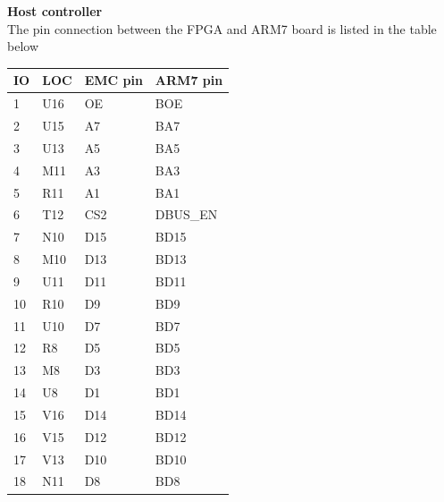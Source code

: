 \textbf{Host controller}\\
The pin connection between the FPGA and ARM7 board is listed in the table below
\begin{table}[H]
    \begin{tabular}{|p{3cm}|p{3cm}|p{3cm}|p{3cm}|}
        \hline
        \textbf{IO} & \textbf{LOC} & \textbf{EMC pin} & \textbf{ARM7 pin} \\ \hline
        1           & U16          & OE               & BOE               \\ \hline
        2           & U15          & A7               & BA7               \\ \hline
        3           & U13          & A5               & BA5               \\ \hline
        4           & M11          & A3               & BA3               \\ \hline
        5           & R11          & A1               & BA1               \\ \hline
        6           & T12          & CS2              & DBUS\_EN          \\ \hline
        7           & N10          & D15              & BD15              \\ \hline
        8           & M10          & D13              & BD13              \\ \hline
        9           & U11          & D11              & BD11              \\ \hline
        10          & R10          & D9               & BD9               \\ \hline
        11          & U10          & D7               & BD7               \\ \hline
        12          & R8           & D5               & BD5               \\ \hline
        13          & M8           & D3               & BD3               \\ \hline
        14          & U8           & D1               & BD1               \\ \hline
        15          & V16          & D14              & BD14              \\ \hline
        16          & V15          & D12              & BD12              \\ \hline
        17          & V13          & D10              & BD10              \\ \hline
        18          & N11          & D8               & BD8               \\ \hline

\end{tabular}
\end{table}
